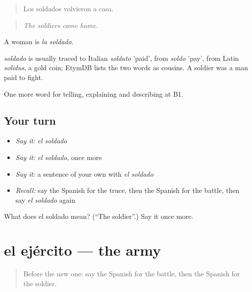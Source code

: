 \begin{quote}
Los soldados volvieron a casa.
\end{quote}

\begin{quote}
\emph{The soldiers came home.}
\end{quote}

A woman is \emph{la soldado}.

\begin{cousinweb}
\emph{soldado} is usually traced to Italian \emph{soldato} 'paid', from \emph{soldo} 'pay', from Latin \emph{solidus}, a gold coin; EtymDB lists the two words as cousins. A soldier was a man paid to fight.
\end{cousinweb}

\begin{grammarlens}[title={What you've built}]
One more word for telling, explaining and describing at B1.
\end{grammarlens}

\subsection*{Your turn}
\begin{itemize}
\raggedright
  \item \emph{Say it:} \emph{el soldado}
  \item \emph{Say it:} \emph{el soldado}, once more
  \item \emph{Say it:} a sentence of your own with \emph{el soldado}
  \item \emph{Recall:} say the Spanish for the truce, then the Spanish for the battle, then say \emph{el soldado} again
\end{itemize}

\begin{tcolorbox}[breakable,colback=teal!4,colframe=teal!35!black,title={Before you move on}]
What does el soldado mean? (\textquotedblleft{}The soldier\textquotedblright{}.) Say it once more.
\end{tcolorbox}
\section[el ejército]{el ejército — the army}

\label{lesson:ES-C567-ejercito}



\begin{quote}
Before the new one: say the Spanish for the battle, then the Spanish for the soldier.
\end{quote}

